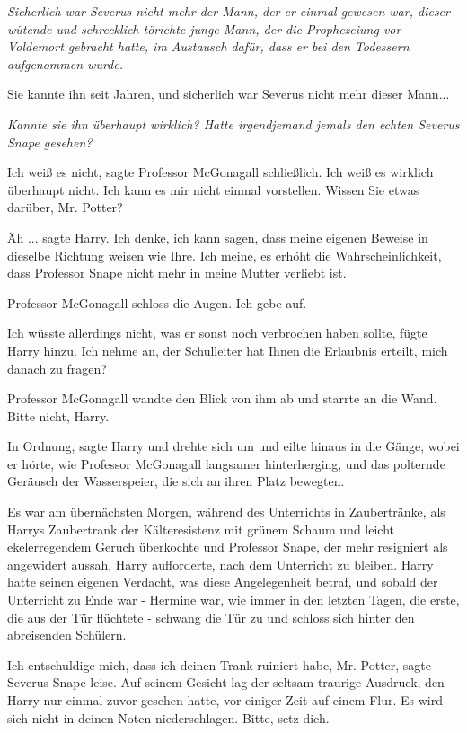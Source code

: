 \emph{Sicherlich war Severus nicht mehr der Mann, der er einmal gewesen war, dieser wütende und schrecklich törichte junge Mann, der die Prophezeiung vor Voldemort gebracht hatte, im Austausch dafür, dass er bei den Todessern aufgenommen wurde.}

Sie kannte ihn seit Jahren, und sicherlich war Severus nicht mehr dieser Mann...

\emph{Kannte sie ihn überhaupt wirklich? Hatte irgendjemand jemals den echten Severus Snape gesehen? }

\glqq Ich weiß es nicht\grqq{}, sagte Professor McGonagall schließlich. \glqq
Ich weiß es wirklich überhaupt nicht. Ich kann es mir nicht einmal vorstellen.
Wissen Sie etwas darüber, Mr. Potter?\grqq{}

\glqq Äh ...\grqq{} sagte Harry. \glqq Ich denke, ich kann sagen, dass meine
eigenen Beweise in dieselbe Richtung weisen wie Ihre. Ich meine, es erhöht die
Wahrscheinlichkeit, dass Professor Snape nicht mehr in meine Mutter verliebt
ist.\grqq{}

Professor McGonagall schloss die Augen. \glqq Ich gebe auf.\grqq{}

\glqq Ich wüsste allerdings nicht, was er sonst noch verbrochen haben
sollte\grqq{}, fügte Harry hinzu. \glqq Ich nehme an, der Schulleiter hat Ihnen
die Erlaubnis erteilt, mich danach zu fragen?\grqq{}

Professor McGonagall wandte den Blick von ihm ab und starrte an die Wand. \glqq
Bitte nicht, Harry.\grqq{}

\glqq In Ordnung\grqq{}, sagte Harry und drehte sich um und eilte hinaus in die
Gänge, wobei er hörte, wie Professor McGonagall langsamer hinterherging, und das
polternde Geräusch der Wasserspeier, die sich an ihren Platz bewegten.

Es war am übernächsten Morgen, während des Unterrichts in Zaubertränke, als
Harrys Zaubertrank der Kälteresistenz mit grünem Schaum und leicht
ekelerregendem Geruch überkochte und Professor Snape, der mehr resigniert als
angewidert aussah, Harry aufforderte, nach dem Unterricht zu bleiben. Harry
hatte seinen eigenen Verdacht, was diese Angelegenheit betraf, und sobald der
Unterricht zu Ende war - Hermine war, wie immer in den letzten Tagen, die erste,
die aus der Tür flüchtete - schwang die Tür zu und schloss sich hinter den
abreisenden Schülern.

\glqq Ich entschuldige mich, dass ich deinen Trank ruiniert habe, Mr.
Potter\grqq{}, sagte Severus Snape leise. Auf seinem Gesicht lag der seltsam
traurige Ausdruck, den Harry nur einmal zuvor gesehen hatte, vor einiger Zeit
auf einem Flur. \glqq Es wird sich nicht in deinen Noten niederschlagen. Bitte,
setz dich.\grqq{}

